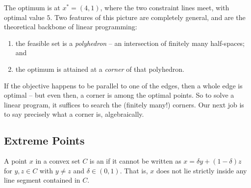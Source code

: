 \documentclass[a4paper]{scrartcl}
\begin{document}
\begin{center}
\end{center}

The optimum is at $x^* = (4,1)$, where the two constraint lines meet, with optimal value $5$. Two features of this picture are completely general, and are the theoretical backbone of linear programming:
\begin{enumerate}[label=(\roman*)]
    \item the feasible set is a \emph{polyhedron} -- an intersection of finitely many half-spaces; and
    \item the optimum is attained at a \emph{corner} of that polyhedron.
\end{enumerate}
If the objective happens to be parallel to one of the edges, then a whole edge is optimal -- but even then, a corner is among the optimal points. So to solve a linear program, it suffices to search the (finitely many!) corners. Our next job is to say precisely what a corner is, algebraically.

\subsection{Extreme Points}

\begin{definition}
    A point $x$ in a convex set $C$ is an  if it cannot be written as $x = \delta y + (1 - \delta)z$ for $y, z \in C$ with $y \neq z$ and $\delta \in (0,1)$. That is, $x$ does not lie strictly inside any line segment contained in $C$.
\end{definition}
\end{document}
